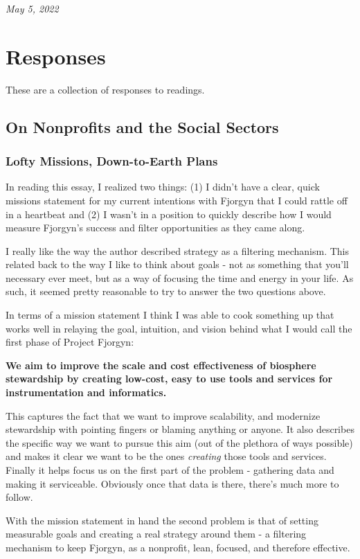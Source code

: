 \documentclass[10pt,a5paper]{book}
\begin{document}
\textit{May 5, 2022}

\chapter{Responses}
These are a collection of responses to readings.

\section{On Nonprofits and the Social Sectors}
\subsection{Lofty Missions, Down-to-Earth Plans}
In reading this essay, I realized two things: (1) I didn't have a clear, quick missions statement for my current intentions with Fjorgyn that I could rattle off in a heartbeat and (2) I wasn't in a position to quickly describe how I would measure Fjorgyn's success and filter opportunities as they came along. 

I really like the way the author described strategy as a filtering mechanism. This related back to the way I like to think about goals - not as something that you'll necessary ever meet, but as a way of focusing the time and energy in your life. As such, it seemed pretty reasonable to try to answer the two questions above. 

In terms of a mission statement I think I was able to cook something up that works well in relaying the goal, intuition, and vision behind what I would call the first phase of Project Fjorgyn:\linebreak

\textbf{We aim to improve the scale and cost effectiveness of biosphere stewardship by creating low-cost, easy to use tools and services for instrumentation and informatics.} \linebreak

This captures the fact that we want to improve scalability, and modernize stewardship with pointing fingers or blaming anything or anyone. It also describes the specific way we want to pursue this aim (out of the plethora of ways possible) and makes it clear we want to be the ones \textit{creating} those tools and services. Finally it helps focus us on the first part of the problem - gathering data and making it serviceable. Obviously once that data is there, there's much more to follow.

With the mission statement in hand the second problem is that of setting measurable goals and creating a real strategy around them - a filtering mechanism to keep Fjorgyn, as a nonprofit, lean, focused, and therefore effective. 
\end{document}

